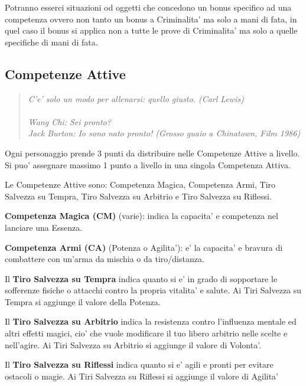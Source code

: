 \documentclass[a4paper,11pt,twoside,openany]{book}
\begin{document}
\bigskip

Potranno esserci situazioni od oggetti che concedono un bonus specifico ad una competenza ovvero non tanto un bonus a Criminalita' ma solo a mani di fata, in quel caso il bonus si applica non a tutte le prove di Criminalita' ma solo a quelle specifiche di mani di fata.


\subsection{Competenze Attive}

\label{competenze-attive}
\begin{quote}\textit{C'e' solo un modo per allenarsi: quello giusto. (Carl Lewis)\\\\
Wang Chi: Sei pronto?\\
Jack Burton: Io sono nato pronto! (Grosso guaio a Chinatown, Film 1986)
}\end{quote}

Ogni personaggio prende 3 punti da distribuire nelle Competenze Attive a livello. Si puo' assegnare massimo 1 punto a livello in una singola Competenza Attiva.

Le Competenze Attive sono: Competenza Magica, Competenza Armi, Tiro Salvezza su Tempra, Tiro Salvezza su Arbitrio e Tiro Salvezza su Riflessi.

\textbf{Competenza Magica (CM)} (varie): indica la capacita' e competenza nel lanciare una Essenza.

\textbf{Competenza Armi (CA)} (Potenza o Agilita'): e' la capacita' e bravura di combattere con un'arma da mischia o da tiro/distanza.

Il \textbf{Tiro Salvezza su Tempra} indica quanto si e' in grado di sopportare le sofferenze fisiche o attacchi contro la propria vitalita' e salute. Ai Tiri Salvezza su Tempra si aggiunge il valore della Potenza. 

Il \textbf{Tiro Salvezza su Arbitrio} indica la resistenza contro l'influenza mentale ed altri effetti magici, cio' che vuole modificare il tuo libero arbitrio nelle scelte e nell'agire. Ai Tiri Salvezza su Arbitrio si aggiunge il valore di Volonta'.

Il \textbf{Tiro Salvezza su Riflessi} indica quanto si e' agili e pronti per evitare ostacoli o magie. Ai Tiri Salvezza su Riflessi si aggiunge il valore di Agilita'
\end{document}
